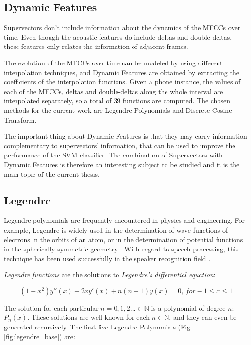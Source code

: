 \subsection{Dynamic Features}

Supervectors don't include information about the dynamics of the MFCCs over time. Even though
the acoustic features do include deltas and double-deltas, these features only relates the
information of adjacent frames.

The evolution of the MFCCs over time can be modeled by using different interpolation techniques,
and Dynamic Features are obtained by extracting the coefficients of the interpolation functions.
Given a phone instance,
the values of each of the MFCCs, deltas and double-deltas along the whole interval are
interpolated separately, so a total of 39 functions are computed.
The chosen methods for the current work are Legendre Polynomials and Discrete Cosine Transform.

The important thing about Dynamic Features is that they
may carry information complementary to supervectors' information, that can be used to improve
the performance of the SVM classifier. The combination
of Supervectors with Dynamic Features is therefore an interesting
subject to be studied and it is the main topic of the current thesis.

\subsection{Legendre}

Legendre polynomials are frequently encountered in physics and engineering.
For example, Legendre is widely used in the determination of wave
functions of electrons in the orbits of an atom, or in the determination of potential
functions in the spherically symmetric geometry \cite{legendre_usage}.
With regard to speech processing,
this technique has been used successfully
in the speaker recognition field \cite{legendre}.

\textit{Legendre functions} are the solutions to \textit{Legendre's differential equation}:

\begin{equation}
(1-x^{2})y''(x)-2xy'(x)+n(n+1)y(x)=0, \ for -1 \leq x \leq 1
\end{equation}

The solution for each particular $n={0, 1, 2 \dotsc} \in \mathbb{N}$ is a polynomial of degree
$n$: $P_{n}(x)$. These solutions are well known for each $n \in \mathbb{N}$, and they can even
be generated recursively. The first five Legendre Polynomials (Fig. \ref{fig:legendre_base}) are:

